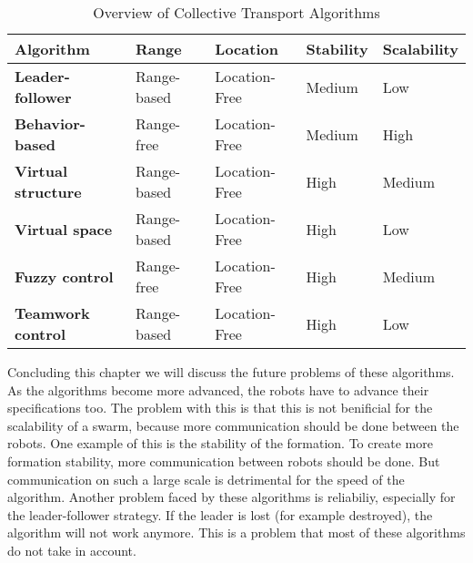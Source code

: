  \begin{table}[H]
  \renewcommand{\arraystretch}{1.3}
  \label{table_alg_coltrans2}
  \caption{Overview of Collective Transport Algorithms}
  \centering
  \begin{tabular}{|p{5cm}|l|l|l|l|}
    \hline
    \bfseries Algorithm & \bfseries Range & Location & \bfseries Stability & \bfseries Scalability\\
    \hline
    \bfseries Leader-follower & Range-based & Location-Free & Medium & Low\\\hline
    \bfseries Behavior-based & Range-free & Location-Free & Medium & High\\\hline
    \bfseries Virtual structure& Range-based& Location-Free & High  & Medium\\\hline
    \bfseries Virtual space & Range-based& Location-Free & High  & Low\\\hline
    \bfseries Fuzzy control& Range-free& Location-Free & High  & Medium\\\hline
    \bfseries Teamwork control& Range-based& Location-Free & High  & Low\\\hline

    \end{tabular}
  \end{table}

Concluding this chapter we will discuss the future problems of these algorithms. 
As the algorithms become more advanced, the robots have to advance their specifications too.
The problem with this is that this is not benificial for the scalability of a swarm, because more communication should be done between the robots. 
One example of this is the stability of the formation. 
To create more formation stability, more communication between robots should be done. 
But communication on such a large scale is detrimental for the speed of the algorithm. 
Another problem faced by these algorithms is reliabiliy, especially for the leader-follower strategy. 
If the leader is lost (for example destroyed), the algorithm will not work anymore. 
This is a problem that most of these algorithms do not take in account.  
